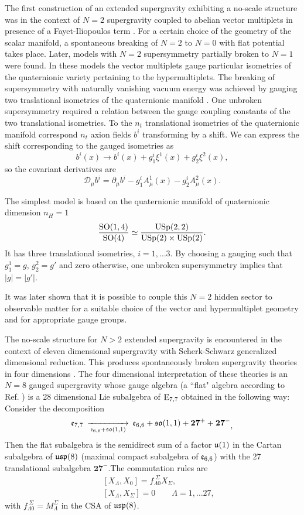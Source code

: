 \documentclass[a4paper,12pt]{article}
\begin{document}
 The first construction of an extended supergravity exhibiting a no-scale structure was in the
context of  $N=2$ supergravity coupled to abelian vector multiplets in presence of a
Fayet-Iliopoulos term \cite{ckpdfwg}. For a certain choice of the geometry of the scalar
manifold, a spontaneous breaking of $N=2$ to $N=0$ with flat potential takes place.  Later,
models with $N=2$ supersymmetry partially broken to $N=1$ were found. In these models the
vector multiplets gauge  particular isometries of the quaternionic variety pertaining to the
hypermultiplets.  The breaking of  supersymmetry with naturally vanishing vacuum energy was
achieved by gauging  two traslational isometries of the quaternionic manifold \cite{cgp,fgp}.
One unbroken supersymmetry required a relation between the  gauge coupling constants of the
two translational isometries. To the  $n_t$ translational isometries of the quaternionic
manifold correspond  $n_t$ axion fields $b^i$ transforming by a shift. We can express the
shift corresponding to the gauged isometries as
 $$b^i(x)\longrightarrow b^i(x) +g_1^i\xi^1(x)+g_2^i\xi^2(x),$$
 so the covariant derivatives are
 $$\mathcal{D}_\mu b^i=\partial_\mu b^i-g_1^iA_\mu^1(x)-g_2^iA_\mu^2(x).$$

 The simplest model \cite{cgp,fgp} is based on the quaternionic manifold of quaternionic
dimension $n_H=1$
 $$\frac{\mathrm{SO}(1,4)}{\mathrm{SO}(4)}\simeq\frac{\mathrm{USp}(2,2)}{\mathrm{USp}(2)\times \mathrm{USp}(2)}.$$
It has three translational isometries, $i=1,\dots 3$. By choosing
a gauging such that $g_1^1=g$, $g_2^2=g'$ and zero otherwise,
one unbroken supersymmetry implies that $|g|=|g'|$.


It was later shown \cite{fgpt,zi} that it is possible to couple this $N=2$ hidden sector to
observable matter for a suitable choice of the vector and hypermultiplet geometry and for
appropriate gauge groups.

The no-scale structure for $N>2$ extended supergravity is encountered in the context of eleven
dimensional supergravity with Scherk-Schwarz generalized dimensional  reduction. This produces
spontaneously broken supergravity theories in four dimensions \cite{ss,css}.
  The four dimensional interpretation of these theories  \cite{adfl2} is an $N=8$ gauged
supergravity whose gauge algebra (a ``flat" algebra according to Ref. \cite{ss}) is a 28
dimensional Lie subalgebra of $\mathrm{E}_{7,7}$ obtained in the following way: Consider the
decomposition
 $$\begin{CD}\fe_{7,7}@>>\fe_{6,6}+\fso(1,1)>\fe_{6,6}+\fso(1,1)+\mathbf{27}^++\mathbf{27}^-
 \end{CD},$$
 Then the flat subalgebra is the semidirect sum of a factor $\mathfrak{u}(1)$ in the Cartan subalgebra
of $\mathfrak{usp}(8)$ (maximal compact subalgebra of $\mathfrak{e}_{6,6}$) with the 27 translational subalgebra
$\mathbf{27}^-$.The commutation rules are
 \begin{eqnarray*}&&[X_\Lambda, X_0]=f_{\Lambda 0}^{\;\Sigma}
X_\Sigma,\\&&[X_\Lambda,X_\Sigma]=0\qquad \Lambda=1,\dots
27,\end{eqnarray*}
with $f_{\Lambda 0}^{\;\Sigma}
=M_\Lambda^\Sigma$ in the CSA of $\mathfrak{usp}(8)$.
\end{document}
